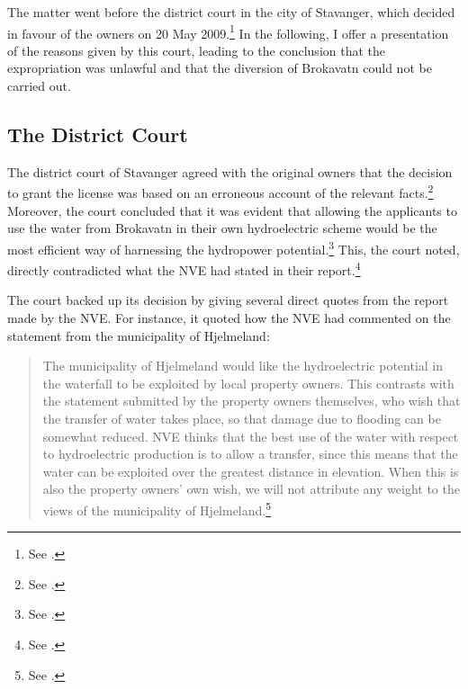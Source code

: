 The matter went before the district court in the city of Stavanger, which decided in favour of the owners on 20 May 2009.\footnote{See \cite{jorpeland09}.} In the following, I offer a presentation of the reasons given by this court, leading to the conclusion that the expropriation was unlawful and that the diversion of Brokavatn could not be carried out.

\subsection{The District Court}

The district court of Stavanger agreed with the original owners that the decision to grant the license was based on an erroneous account of the relevant facts.\footnote{See \cite[25]{jorpeland11}.} Moreover, the court concluded that it was evident that allowing the applicants to use the water from Brokavatn in their own hydroelectric scheme would be the most efficient way of harnessing the hydropower potential.\footnote{See \cite[22-23]{jorpeland09}.} This, the court noted, directly contradicted what the NVE had stated in their report.\footnote{See \cite[23]{jorpeland09}.}

The court backed up its decision by giving several direct quotes from the report made by the NVE. For instance, it quoted how the NVE had commented on the statement from the municipality of Hjelmeland:
\begin{quote}
The municipality of Hjelmeland would like the hydroelectric potential in the waterfall to be exploited by local property owners. This contrasts with the statement submitted by the property owners 
themselves, who wish that the transfer of water takes place, so that damage due to flooding can be 
somewhat reduced. NVE thinks that the best use of the water with respect to hydroelectric 
production is to allow a transfer, since this means that the water can be exploited over the greatest
distance in elevation. When this is also the property owners' own wish, we will not attribute any 
weight to the views of the municipality of Hjelmeland.\footnote{See \cite[12]{jorpeland09}.}
\end{quote}

